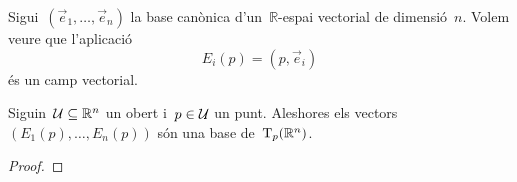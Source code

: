 \documentclass[../../Main.tex]{subfiles}
\begin{document}
	\begin{example}%
		\label{ex:camp vectorial canònic}
		Sigui~\((\vec{e}_{1},\dots,\vec{e}_{n})\) la base canònica d'un~\(\mathbb{R}\)-espai vectorial de dimensió~\(n\).
		Volem veure que l'aplicació
		\[
		    E_{i}(p)=(p,\vec{e}_{i})
		\]
		és un camp vectorial.
		\begin{solution}
		\end{solution}
	\end{example}
	\begin{proposition}
		\label{prop:els camps vectorials canònics són una base de l'espai tangent}
		Siguin~\(\mathcal{U}\subseteq\mathbb{R}^{n}\) un obert i~\(p\in\mathcal{U}\) un punt.
		Aleshores els vectors~\((E_{1}(p),\dots,E_{n}(p))\) són una base de~\(\operatorname{T}_{p}(\mathbb{R}^{n})\).
		\begin{proof}
		\end{proof}
	\end{proposition}
\end{document}
